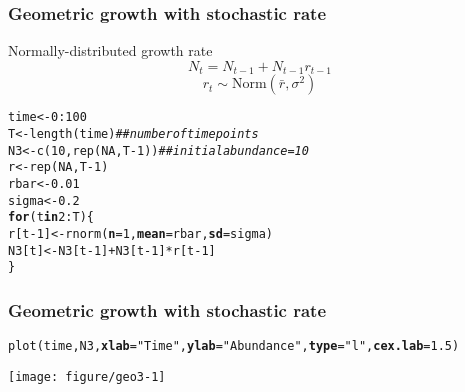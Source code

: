 \documentclass[color=usenames,dvipsnames]{beamer}\usepackage[]{graphicx}\usepackage[]{color}
\makeatletter
\newcommand{\hlnum}[1]{\textcolor[rgb]{0.69,0.494,0}{#1}}%
\newcommand{\hlstr}[1]{\textcolor[rgb]{0.749,0.012,0.012}{#1}}%
\newcommand{\hlcom}[1]{\textcolor[rgb]{0.514,0.506,0.514}{\textit{#1}}}%
\newcommand{\hlopt}[1]{\textcolor[rgb]{0,0,0}{#1}}%
\newcommand{\hlstd}[1]{\textcolor[rgb]{0,0,0}{#1}}%
\newcommand{\hlkwa}[1]{\textcolor[rgb]{0,0,0}{\textbf{#1}}}%
\newcommand{\hlkwb}[1]{\textcolor[rgb]{0,0.341,0.682}{#1}}%
\newcommand{\hlkwc}[1]{\textcolor[rgb]{0,0,0}{\textbf{#1}}}%
\newcommand{\hlkwd}[1]{\textcolor[rgb]{0.004,0.004,0.506}{#1}}%
\newenvironment{kframe}{%
 \def\at@end@of@kframe{}%
 \ifinner\ifhmode%
  \def\at@end@of@kframe{\end{minipage}}%
  \begin{minipage}{\columnwidth}%
 \fi\fi%
 \def\FrameCommand##1{\hskip\@totalleftmargin \hskip-\fboxsep
 \colorbox{shadecolor}{##1}\hskip-\fboxsep
     \hskip-\linewidth \hskip-\@totalleftmargin \hskip\columnwidth}%
 \MakeFramed {\advance\hsize-\width
   \@totalleftmargin\z@ \linewidth\hsize
   \@setminipage}}%
 {\par\unskip\endMakeFramed%
 \at@end@of@kframe}
\newenvironment{knitrout}{}{} %
\makeatother
\begin{document}
\begin{frame}[fragile]
  \frametitle{Geometric growth with stochastic rate}
  Normally-distributed growth rate
  \[
    N_t = N_{t-1} + N_{t-1}r_{t-1}
  \]
  \[
    r_t \sim \mathrm{Norm}(\bar{r}, \sigma^2)
  \]
  \pause
\begin{knitrout}\small
{}\color{fgcolor}\begin{kframe}
\begin{alltt}
\hlstd{time} \hlkwb{<-} \hlnum{0}\hlopt{:}\hlnum{100}
\hlstd{T} \hlkwb{<-} \hlkwd{length}\hlstd{(time)}     \hlcom{## number of time points}
\hlstd{N3} \hlkwb{<-} \hlkwd{c}\hlstd{(}\hlnum{10}\hlstd{,} \hlkwd{rep}\hlstd{(}\hlnum{NA}\hlstd{, T}\hlopt{-}\hlnum{1}\hlstd{))}  \hlcom{## initial abundance = 10}
\hlstd{r} \hlkwb{<-} \hlkwd{rep}\hlstd{(}\hlnum{NA}\hlstd{, T}\hlopt{-}\hlnum{1}\hlstd{)}
\hlstd{rbar} \hlkwb{<-} \hlnum{0.01}
\hlstd{sigma} \hlkwb{<-} \hlnum{0.2}
\hlkwa{for}\hlstd{(t} \hlkwa{in} \hlnum{2}\hlopt{:}\hlstd{T) \{}
    \hlstd{r[t}\hlopt{-}\hlnum{1}\hlstd{]} \hlkwb{<-} \hlkwd{rnorm}\hlstd{(}\hlkwc{n}\hlstd{=}\hlnum{1}\hlstd{,} \hlkwc{mean}\hlstd{=rbar,} \hlkwc{sd}\hlstd{=sigma)}
    \hlstd{N3[t]} \hlkwb{<-} \hlstd{N3[t}\hlopt{-}\hlnum{1}\hlstd{]} \hlopt{+} \hlstd{N3[t}\hlopt{-}\hlnum{1}\hlstd{]}\hlopt{*}\hlstd{r[t}\hlopt{-}\hlnum{1}\hlstd{]}
\hlstd{\}}
\end{alltt}
\end{kframe}
\end{knitrout}
\end{frame}



\begin{frame}[fragile]
  \frametitle{Geometric growth with stochastic rate}
\begin{knitrout}\scriptsize
{}\color{fgcolor}\begin{kframe}
\begin{alltt}
\hlkwd{plot}\hlstd{(time, N3,} \hlkwc{xlab}\hlstd{=}\hlstr{"Time"}\hlstd{,} \hlkwc{ylab}\hlstd{=}\hlstr{"Abundance"}\hlstd{,} \hlkwc{type}\hlstd{=}\hlstr{"l"}\hlstd{,} \hlkwc{cex.lab}\hlstd{=}\hlnum{1.5}\hlstd{)}
\end{alltt}
\end{kframe}

{\centering \texttt{[image: figure/geo3-1]} 

}



\end{knitrout}
\end{frame}
\end{document}
